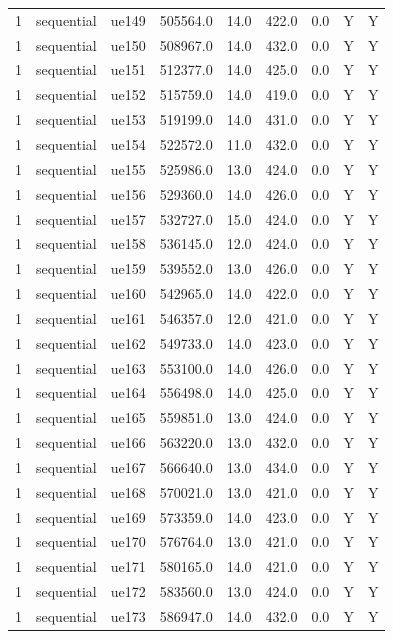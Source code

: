 \begin{table}[ht]
\begin{tabular}{|c|c|c|c|c|c|c|c|c|}
1 & sequential & ue149 & 505564.0 & 14.0 & 422.0 & 0.0 & Y & Y \\
1 & sequential & ue150 & 508967.0 & 14.0 & 432.0 & 0.0 & Y & Y \\
1 & sequential & ue151 & 512377.0 & 14.0 & 425.0 & 0.0 & Y & Y \\
1 & sequential & ue152 & 515759.0 & 14.0 & 419.0 & 0.0 & Y & Y \\
1 & sequential & ue153 & 519199.0 & 14.0 & 431.0 & 0.0 & Y & Y \\
1 & sequential & ue154 & 522572.0 & 11.0 & 432.0 & 0.0 & Y & Y \\
1 & sequential & ue155 & 525986.0 & 13.0 & 424.0 & 0.0 & Y & Y \\
1 & sequential & ue156 & 529360.0 & 14.0 & 426.0 & 0.0 & Y & Y \\
1 & sequential & ue157 & 532727.0 & 15.0 & 424.0 & 0.0 & Y & Y \\
1 & sequential & ue158 & 536145.0 & 12.0 & 424.0 & 0.0 & Y & Y \\
1 & sequential & ue159 & 539552.0 & 13.0 & 426.0 & 0.0 & Y & Y \\
1 & sequential & ue160 & 542965.0 & 14.0 & 422.0 & 0.0 & Y & Y \\
1 & sequential & ue161 & 546357.0 & 12.0 & 421.0 & 0.0 & Y & Y \\
1 & sequential & ue162 & 549733.0 & 14.0 & 423.0 & 0.0 & Y & Y \\
1 & sequential & ue163 & 553100.0 & 14.0 & 426.0 & 0.0 & Y & Y \\
1 & sequential & ue164 & 556498.0 & 14.0 & 425.0 & 0.0 & Y & Y \\
1 & sequential & ue165 & 559851.0 & 13.0 & 424.0 & 0.0 & Y & Y \\
1 & sequential & ue166 & 563220.0 & 13.0 & 432.0 & 0.0 & Y & Y \\
1 & sequential & ue167 & 566640.0 & 13.0 & 434.0 & 0.0 & Y & Y \\
1 & sequential & ue168 & 570021.0 & 13.0 & 421.0 & 0.0 & Y & Y \\
1 & sequential & ue169 & 573359.0 & 14.0 & 423.0 & 0.0 & Y & Y \\
1 & sequential & ue170 & 576764.0 & 13.0 & 421.0 & 0.0 & Y & Y \\
1 & sequential & ue171 & 580165.0 & 14.0 & 421.0 & 0.0 & Y & Y \\
1 & sequential & ue172 & 583560.0 & 13.0 & 424.0 & 0.0 & Y & Y \\
1 & sequential & ue173 & 586947.0 & 14.0 & 432.0 & 0.0 & Y & Y \\

\end{tabular}
\end{table}
